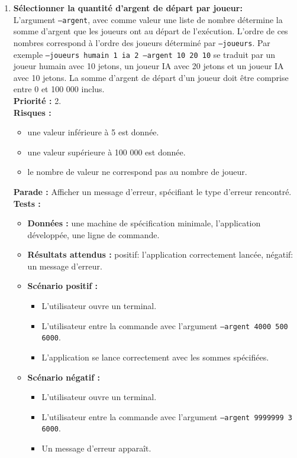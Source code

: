 \documentclass{article}
\newcommand{\code}[1]{\colorbox{light-gray}{\texttt{#1}}}
\begin{document}
\begin{enumerate}
    \item \textbf{Sélectionner la quantité d'argent de départ par joueur:}\\
    L'argument \code{--argent}, avec comme valeur une liste de nombre détermine la somme d'argent que les joueurs ont au départ de l'exécution. L'ordre de ces nombres correspond à l'ordre des joueurs déterminé par \code{--joueurs}.
    Par exemple \code{--joueurs humain 1 ia 2 --argent 10 20 10} se traduit par un joueur humain avec 10 jetons, un joueur IA avec 20 jetons et un joueur IA avec 10 jetons. La somme d'argent de départ d'un joueur doit être comprise entre 0 et 100 000 inclus. \\
    \textbf{Priorité :} 2. \\
    \textbf{Risques :}
    \begin{itemize}
        \item une valeur inférieure à 5 est donnée.
        \item une valeur supérieure à 100 000 est donnée.
        \item le nombre de valeur ne correspond pas au nombre de joueur.
    \end{itemize}
    \textbf{Parade :} Afficher un message d'erreur, spécifiant le type d'erreur rencontré.\\
    \textbf{Tests :}
    \begin{itemize}
        \item \textbf{Données :} une machine de spécification minimale, l'application développée, une ligne de commande.
        \item \textbf{Résultats attendus :} positif: l'application correctement lancée, négatif: un message d'erreur.
        \item \textbf{Scénario positif :}
        \begin{itemize}
            \item L’utilisateur ouvre un terminal.
            \item L’utilisateur entre la commande avec l'argument \code{--argent 4000 500 6000}.
            \item L'application se lance correctement avec les sommes spécifiées.
        \end{itemize}
        \item \textbf{Scénario négatif :}
        \begin{itemize}
            \item L’utilisateur ouvre un terminal.
            \item L’utilisateur entre la commande avec l'argument \code{--argent 9999999 3 6000}.
            \item Un message d'erreur apparaît.
        \end{itemize}
    \end{itemize}


\end{enumerate}
\end{document}
